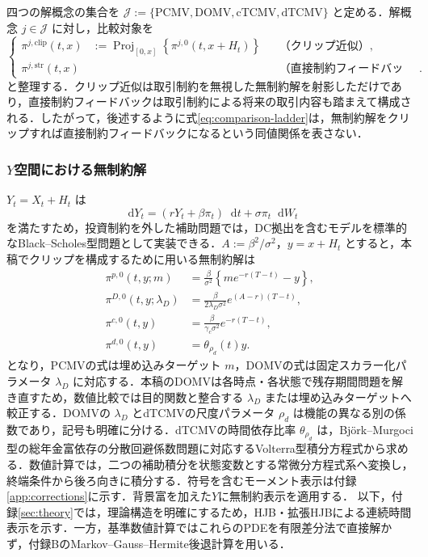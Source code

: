 \documentclass[10pt,a4paper]{article}
\theoremstyle{plain}
\theoremstyle{definition}
\DeclareMathOperator{\Proj}{Proj}
\newcommand{\dd}{\mathop{}\!\mathrm{d}}
\begin{document}
四つの解概念の集合を $\mathcal J:=\{\mathrm{PCMV},\mathrm{DOMV},\mathrm{cTCMV},\mathrm{dTCMV}\}$ と定める．解概念 $j\in\mathcal J$ に対し，比較対象を
\begin{equation}
\left\{
\begin{aligned}
\pi^{j,\mathrm{clip}}(t,x)
&:=\Proj_{[0,x]}\!\left\{\pi^{j,0}(t,x+H_t)\right\}
&&\text{（クリップ近似）},\\
\pi^{j,\mathrm{str}}(t,x)
&&&\text{（直接制約フィードバック）}.
\end{aligned}
\right.
\label{eq:comparison-ladder}
\end{equation}
と整理する．クリップ近似は取引制約を無視した無制約解を射影しただけであり，直接制約フィードバックは取引制約による将来の取引内容も踏まえて構成される．したがって，後述するように式\eqref{eq:comparison-ladder}は，無制約解をクリップすれば直接制約フィードバックになるという同値関係を表さない．

\subsubsection{$Y$空間における無制約解}

$Y_t=X_t+H_t$ は
\[
\dd Y_t=(rY_t+\beta\pi_t)\dd t+\sigma\pi_t\dd W_t
\]
を満たすため，投資制約を外した補助問題では，DC拠出を含むモデルを標準的なBlack--Scholes型問題として実装できる．$A:=\beta^2/\sigma^2$，$y=x+H_t$ とすると，本稿でクリップを構成するために用いる無制約解は
\begin{align}
  \pi^{p,0}(t,y;m)
  &=\frac{\beta}{\sigma^2}\left\{m e^{-r(T-t)}-y\right\},\label{eq:unc-p}\\
  \pi^{D,0}(t,y;\lambda_D)
  &=\frac{\beta}{2\lambda_D\sigma^2}e^{(A-r)(T-t)},\label{eq:unc-D}\\
  \pi^{c,0}(t,y)
  &=\frac{\beta}{\gamma_c\sigma^2}e^{-r(T-t)},\label{eq:unc-c}\\
  \pi^{d,0}(t,y)
  &=\theta_{\rho_d}(t)y.\label{eq:unc-d}
\end{align}
となり，PCMVの式は埋め込みターゲット $m$，DOMVの式は固定スカラー化パラメータ $\lambda_D$ に対応する．本稿のDOMVは各時点・各状態で残存期間問題を解き直すため，数値比較では目的関数と整合する $\lambda_D$ または埋め込みターゲットへ較正する．DOMVの $\lambda_D$ とdTCMVの尺度パラメータ $\rho_d$ は機能の異なる別の係数であり，記号も明確に分ける．dTCMVの時間依存比率 $\theta_{\rho_d}$ は，Björk--Murgoci型の総年金富依存の分散回避係数問題に対応するVolterra型積分方程式から求める．数値計算では，二つの補助積分を状態変数とする常微分方程式系へ変換し，終端条件から後ろ向きに積分する．符号を含むモーメント表示は付録\ref{app:corrections}に示す．背景富を加えた$Y$に無制約表示を適用する．
以下，付録\ref{sec:theory}では，理論構造を明確にするため，HJB・拡張HJBによる連続時間表示を示す．一方，基準数値計算ではこれらのPDEを有限差分法で直接解かず，付録BのMarkov--Gauss--Hermite後退計算を用いる．
\end{document}
